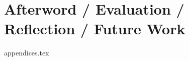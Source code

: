 \documentclass[a4paper,11pt,twoside]{report}
\begin{document}




\chapter{Afterword / Evaluation / Reflection / Future Work}


\clearpage





{appendices.tex}
\end{document}

